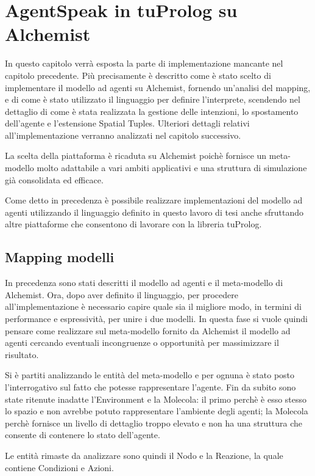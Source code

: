 \chapter{AgentSpeak in tuProlog su Alchemist}\label{chap:agentspeak-2p-alchemist}
In questo capitolo verrà esposta la parte di implementazione mancante nel capitolo precedente. Più precisamente è descritto come è stato scelto di implementare il modello ad agenti su Alchemist, fornendo un'analisi del mapping, e di come è stato utilizzato il linguaggio per definire l'interprete, scendendo nel dettaglio di come è stata realizzata la gestione delle intenzioni, lo spostamento dell'agente e l'estensione Spatial Tuples. Ulteriori dettagli relativi all'implementazione verranno analizzati nel capitolo successivo.

La scelta della piattaforma è ricaduta su Alchemist poichè fornisce un meta-modello molto adattabile a vari ambiti applicativi e una struttura di simulazione già consolidata ed efficace.

Come detto in precedenza è possibile realizzare implementazioni del modello ad agenti utilizzando il linguaggio definito in questo lavoro di tesi anche sfruttando altre piattaforme che consentono di lavorare con la libreria tuProlog.

\section{Mapping modelli}\label{sctn:mapping}
In precedenza sono stati descritti il modello ad agenti e il meta-modello di Alchemist. Ora, dopo aver definito il linguaggio, per procedere all'implementazione è necessario capire quale sia il migliore modo, in termini di performance e espressività, per unire i due modelli.
In questa fase si vuole quindi pensare come realizzare sul meta-modello fornito da Alchemist il modello ad agenti cercando eventuali incongruenze o opportunità per massimizzare il risultato.

Si è partiti analizzando le entità del meta-modello e per ognuna è stato posto l'interrogativo sul fatto che potesse rappresentare l'agente.
Fin da subito sono state ritenute inadatte l'Environment e la Molecola: il primo perchè è esso stesso lo spazio e non avrebbe potuto rappresentare l'ambiente degli agenti; la Molecola perchè fornisce un livello di dettaglio troppo elevato e non ha una struttura che consente di contenere lo stato dell'agente.

Le entità rimaste da analizzare sono quindi il Nodo e la Reazione, la quale contiene Condizioni e Azioni.

